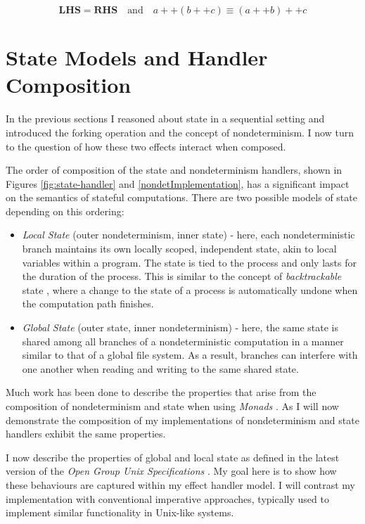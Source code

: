 \documentclass[logo,bsc,singlespacing,parskip]{infthesis}
\begin{document}
\[
\textbf{LHS} = \textbf{RHS} \quad \text{and} \quad a ++ (b ++ c) \equiv (a ++ b) ++ c
\]




\section{State Models and Handler Composition}
In the previous sections I reasoned about state in a  sequential setting and introduced the forking operation and the concept of nondeterminism. I now turn to the question of how these two effects interact when composed. 

The order of composition of the state  and nondeterminism handlers, shown in Figures \ref{fig:state-handler} and \ref{nondetImplementation}, has a significant impact on the semantics of stateful computations. There are two possible models of state  depending on this ordering: 
\begin{itemize}
    \item \textit{Local State} (outer nondeterminism, inner state) - here, each nondeterministic branch maintains its own locally scoped, independent state, akin to local variables within a program.  The state is tied to the process and only lasts for the duration of the process. This is similar to the concept of \textit{backtrackable} state \cite{backtrackable}, where a change to the state of a process is automatically undone when the computation path finishes. 
    \item \textit{Global State} (outer state, inner nondeterminism) - here, the same state is shared among all branches of a nondeterministic computation in a manner similar to that  of a global file system. As a result, branches can interfere with one another when reading and writing to the same shared state.
\end{itemize}

Much work has been done to describe the properties that arise from the composition of nondeterminism and state when using \textit{Monads} \cite{monads}. As I will now demonstrate the composition of my implementations of nondeterminism and state handlers exhibit the same properties. 

I now describe the properties of global and local state as defined in the latest version of the \textit{Open Group Unix Specifications} \cite{posix}. My goal here is to show how these behaviours are captured within my effect handler model. I will contrast my implementation with conventional imperative approaches, typically used to implement similar functionality in Unix-like systems. 
\end{document}
